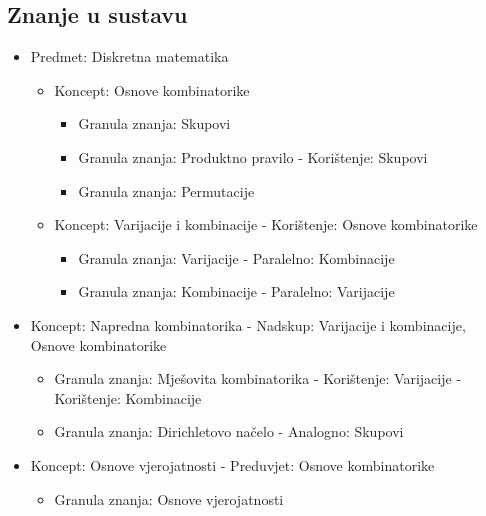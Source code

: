 \documentclass[times, utf8, zavrsni, numeric]{fer}
\begin{document}
\pagebreak
\subsection{Znanje u sustavu}
\begin{itemize}
	\item Predmet: Diskretna matematika
	\begin{itemize}
		\item Koncept: Osnove kombinatorike
		\begin{itemize}
			\item Granula znanja: Skupovi
			\item Granula znanja: Produktno pravilo
			\newline - Korištenje: Skupovi
			\item Granula znanja: Permutacije
		\end{itemize}
		\item Koncept: Varijacije i kombinacije
		\newline - Korištenje: Osnove kombinatorike
			\begin{itemize}
				\item Granula znanja: Varijacije
				\newline - Paralelno: Kombinacije
				\item Granula znanja: Kombinacije
				\newline - Paralelno: Varijacije
			\end{itemize}
		\end{itemize}
		\item Koncept: Napredna kombinatorika
		\newline - Nadskup: Varijacije i kombinacije, Osnove kombinatorike
		\begin{itemize}
			\item Granula znanja: Mješovita kombinatorika
			\newline - Korištenje: Varijacije
			\newline - Korištenje: Kombinacije
			\item Granula znanja: Dirichletovo načelo
			\newline - Analogno: Skupovi
		\end{itemize}
		\item Koncept: Osnove vjerojatnosti
		\newline - Preduvjet: Osnove kombinatorike
		\begin{itemize}
			\item Granula znanja: Osnove vjerojatnosti
		\end{itemize}
	\end{itemize}
\end{document}
